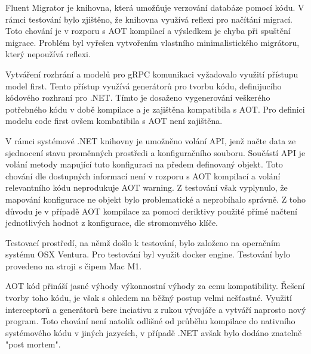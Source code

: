 Fluent Migrator je knihovna, která umožňuje verzování databáze pomocí kódu. V rámci testování bylo zjištěno, že knihovna využívá reflexi pro načítání migrací. Toto chování je v rozporu s AOT kompilací a výsledkem je chyba při spuštění migrace. Problém byl vyřešen vytvořením vlastního minimalistického migrátoru, který nepoužívá reflexi.


Vytváření rozhrání a modelů pro gRPC komunikaci vyžadovalo využití přístupu model first. Tento přístup využívá generátorů pro tvorbu kódu, definijucího kódového rozhraní pro .NET. Tímto je dosaženo vygenerování veškerého potřebného kódu v době kompilace a je zajištěna kompatibila s AOT. Pro definici modelu code first ovšem kombatibila s AOT není zajištěna.


V rámci systémové .NET knihovny je umožněno volání API, jenž načte data ze sjednocení stavu proměnných prostředi a konfiguračního souboru. Součástí API je volání metody mapující tuto konfiguraci na předem definovaný objekt. Toto chování dle dostupných informací není v rozporu s AOT kompilací a volání relevantního kódu neprodukuje AOT warning. Z testování však vyplynulo, že mapování konfigurace ne objekt bylo problematické a neprobíhalo správně. Z toho důvodu je v případě AOT kompilace za pomocí deriktivy použité přímé načtení jednotlivých hodnot z konfigurace, dle stromomvého klíče.




Testovací prostředí, na němž došlo k testování, bylo založeno na operačním systému OSX Ventura. Pro testování byl využit docker engine. Testování bylo provedeno na stroji s čipem Mac M1.








AOT kód přináší jasné výhody výkonnostní výhody za cenu kompatibility. Řešení tvorby toho kódu, je však s ohledem na běžný postup velmi nešťastné. Využití interceptorů a generátorů bere inciativu z rukou vývojáře a vytváří naprosto nový program. Toto chování není natolik odlišné od průběhu kompilace do nativního systémového kódu v jiných jazycích, v případě .NET avšak bylo dodáno znatelně "post mortem".

